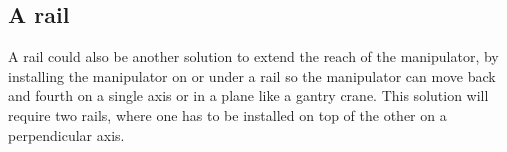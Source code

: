 \subsection{A rail} 
A rail could also be another solution to extend the reach of the manipulator, by installing the manipulator on or under a rail so the manipulator can move back and fourth on a single axis or in a plane like a gantry crane. This solution will require two rails, where one has to be installed on top of the other on a perpendicular axis\cite{FRUNS}.